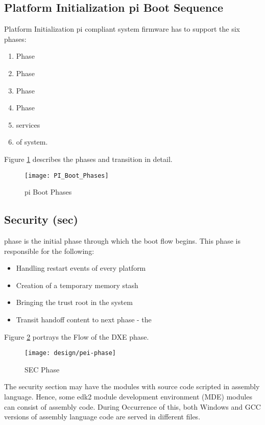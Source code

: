 \subsection{Platform Initialization \gls{pi} Boot Sequence}
Platform Initialization \gls{pi} compliant system firmware has to support the six phases: 
\begin{enumerate}
	\item {} Phase
	\item {} Phase
	\item {} Phase
	\item {} Phase
	\item {} services 
	\item {} of system. 
\end{enumerate}
Figure \ref{fig:design-pi-boot-phases} describes the phases and transition in detail.

\begin{figure}[!htbp]
	\centering
	\texttt{[image: PI\_Boot\_Phases]}
	\caption{\gls{pi} Boot Phases \cite{beyond-bios}}\label{fig:design-pi-boot-phases}
\end{figure}

\subsection{Security (\gls{sec})}
 phase is the initial phase through which the boot flow begins. This phase is responsible for the following:
\begin{itemize}
	\item Handling restart events of every platform
	\item Creation of a temporary memory stash
	\item Bringing the trust root in the system
	\item Transit handoff content to next phase - the 
\end{itemize}

Figure \ref{fig:sec-phase} portrays the Flow of the DXE phase.

\begin{figure}[!htbp]
	\centering
	\texttt{[image: design/pei-phase]}
	\caption{SEC Phase}\label{fig:sec-phase}
\end{figure}

The security section may have the modules with source code scripted in assembly language. Hence, some \gls{edk2} module development environment (MDE) modules can consist of assembly code. During Occurrence of this, both Windows and GCC versions of assembly language code are served in different files.

